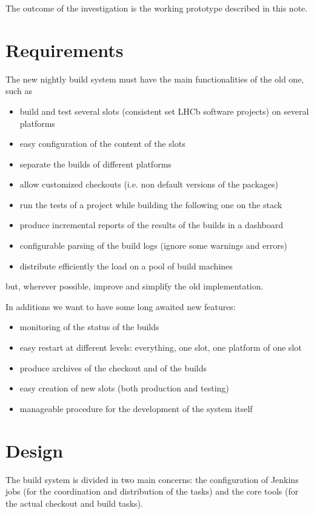 \documentclass{lhcbnote}
\begin{document}
The outcome of the investigation is the working prototype described in this
note.

\section{Requirements}
The new nightly build system must have the main functionalities of the old one,
such as
\begin{itemize}
  \item build and test several slots (consistent set LHCb software projects) on
several platforms
  \item easy configuration of the content of the slots
  \item separate the builds of different platforms
  \item allow customized checkouts (i.e. non default versions of the packages)
  \item run the tests of a project while building the following one on the stack
  \item produce incremental reports of the results of the builds in a dashboard
  \item configurable parsing of the build logs (ignore some warnings and errors)
  \item distribute efficiently the load on a pool of build machines
\end{itemize}
but, wherever possible, improve and simplify the old implementation.

In additions we want to have some long awaited new features:
\begin{itemize}
  \item monitoring of the status of the builds
  \item easy restart at different levels: everything, one slot, one platform of
one slot
  \item produce archives of the checkout and of the builds
  \item easy creation of new slots (both production and testing)
  \item manageable procedure for the development of the system itself
\end{itemize}

\section{Design}
The build system is divided in two main concerns: the configuration of Jenkins
jobs (for the coordination and distribution of the tasks) and the core tools
(for the actual checkout and build tasks).
\end{document}

